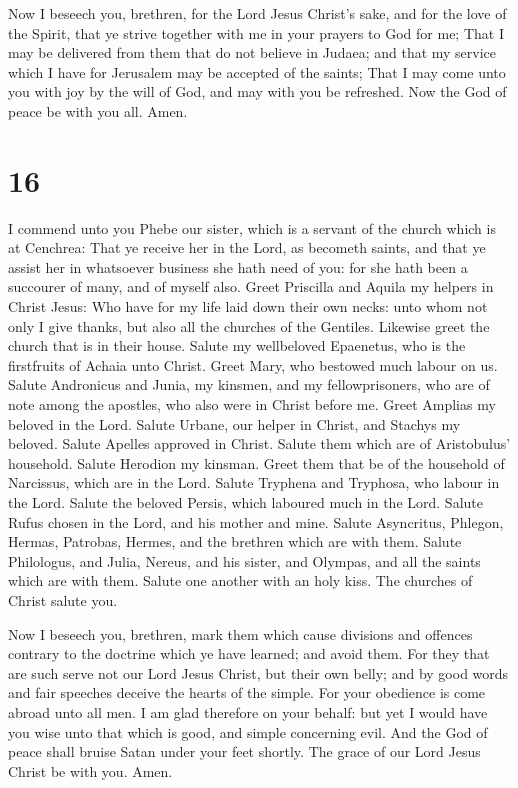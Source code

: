  Now I beseech you, brethren, for the Lord Jesus Christ's
sake, and for the love of the Spirit, that ye strive together with me in
your prayers to God for me;  That I may be delivered from
them that do not believe in Judaea; and that my service which I have for
Jerusalem may be accepted of the saints;  That I may come
unto you with joy by the will of God, and may with you be refreshed.
 Now the God of peace be with you all. Amen.

\hypertarget{section-15}{%
\section{16}\label{section-15}}

 I commend unto you Phebe our sister, which is a servant of
the church which is at Cenchrea:  That ye receive her in the
Lord, as becometh saints, and that ye assist her in whatsoever business
she hath need of you: for she hath been a succourer of many, and of
myself also.  Greet Priscilla and Aquila my helpers in
Christ Jesus:  Who have for my life laid down their own
necks: unto whom not only I give thanks, but also all the churches of
the Gentiles.  Likewise greet the church that is in their
house. Salute my wellbeloved Epaenetus, who is the firstfruits of Achaia
unto Christ.  Greet Mary, who bestowed much labour on us.
 Salute Andronicus and Junia, my kinsmen, and my
fellowprisoners, who are of note among the apostles, who also were in
Christ before me.  Greet Amplias my beloved in the Lord.
 Salute Urbane, our helper in Christ, and Stachys my
beloved.  Salute Apelles approved in Christ. Salute them
which are of Aristobulus' household.  Salute Herodion my
kinsman. Greet them that be of the household of Narcissus, which are in
the Lord.  Salute Tryphena and Tryphosa, who labour in the
Lord. Salute the beloved Persis, which laboured much in the Lord.
 Salute Rufus chosen in the Lord, and his mother and mine.
 Salute Asyncritus, Phlegon, Hermas, Patrobas, Hermes, and
the brethren which are with them.  Salute Philologus, and
Julia, Nereus, and his sister, and Olympas, and all the saints which are
with them.  Salute one another with an holy kiss. The
churches of Christ salute you.

 Now I beseech you, brethren, mark them which cause
divisions and offences contrary to the doctrine which ye have learned;
and avoid them.  For they that are such serve not our Lord
Jesus Christ, but their own belly; and by good words and fair speeches
deceive the hearts of the simple.  For your obedience is
come abroad unto all men. I am glad therefore on your behalf: but yet I
would have you wise unto that which is good, and simple concerning evil.
 And the God of peace shall bruise Satan under your feet
shortly. The grace of our Lord Jesus Christ be with you. Amen.

